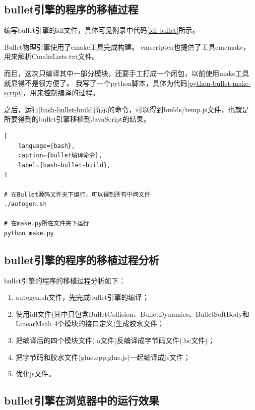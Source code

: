 \subsection{bullet引擎的程序的移植过程}

编写bullet引擎的idl文件，具体可见附录中代码\ref{idl-bullet}所示。

Bullet物理引擎使用了cmake工具完成构建。
emscripten也提供了工具emcmake，用来解析CmakeLists.txt文件。

而且，这次只编译其中一部分模块，还要手工打成一个闭包，以前使用make工具就显得不是很方便了。
我写了一个python脚本，具体为代码\ref{python-bullet-make-script}，用来控制编译的过程。



之后，运行\ref{bash-bullet-build}所示的命令，可以得到builds/temp.js文件，也就是所要得到的bullet引擎移植到JavaScript的结果。

\begin{lstlisting}[
    language={bash},
    caption={bullet编译命令},
    label={bash-bullet-build},
]

# 在Bullet源码文件夹下运行，可以得到所有中间文件
./autogen.sh

# 在make.py所在文件夹下运行
python make.py
\end{lstlisting}



\subsection{bullet引擎的程序的移植过程分析}

bullet引擎的程序的移植过程分析如下：

\begin{enumerate}
    \item autogen.sh文件，先完成bullet引擎的编译；
    \item 使用idl文件(其中只包含BulletCollision、BulletDynamics、BulletSoftBody和LinearMath 4个模块的接口定义)生成胶水文件；
    \item 把编译后的四个模块文件(.a文件)反编译成字节码文件(.bc文件)；
    \item 把字节码和胶水文件(glue.cpp,glue.js)一起编译成js文件；
	  \item 优化js文件。
\end{enumerate}

\subsection{bullet引擎在浏览器中的运行效果}

